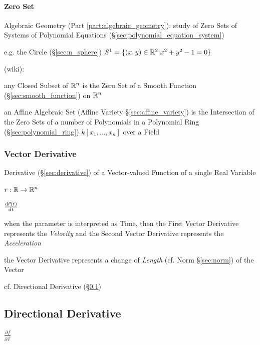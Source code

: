 {\paragraph{Zero Set}\label{sec:zero_set}\hfill

\fist Algebraic Geometry (Part \ref{part:algebraic_geometry}): study of Zero
Sets of Systems of Polynomial Equations
(\S\ref{sec:polynomial_equation_system})

e.g. the Circle (\S\ref{sec:n_sphere}) $S^1 = \{ (x,y) \in \mathbb{R}^2 | x^2 + y^2
- 1 = 0 \}$

(wiki):

any Closed Subset of $\mathbb{R}^n$ is the Zero Set of a Smooth Function
(\S\ref{sec:smooth_function}) on $\mathbb{R}^n$

an Affine Algebraic Set (Affine Variety \S\ref{sec:affine_variety}) is the
Intersection of the Zero Sets of a number of Polynomials in a Polynomial Ring
(\S\ref{sec:polynomial_ring}) $k[x_1,\ldots,x_n]$ over a Field



\subsubsection{Vector Derivative}\label{sec:vector_derivative}

Derivative (\S\ref{sec:derivative}) of a Vector-valued Function of a single Real
Variable

$r : \mathbb{R} \rightarrow \mathbb{R}^n$

$\frac{\mathrm{d}\vec{r}(t)}{\mathrm{d}t}$

when the parameter is interpreted as Time, then the First Vector Derivative
represents the \emph{Velocity} and the Second Vector Derivative represents the
\emph{Acceleration}

the Vector Derivative represents a change of \emph{Length} (cf. Norm
\S\ref{sec:norm}) of the Vector

cf. Directional Derivative (\S\ref{sec:directional_derivative})



\subsection{Directional Derivative}\label{sec:directional_derivative}

$\frac{\partial{f}}{\partial{\vec{v}}}$

}
